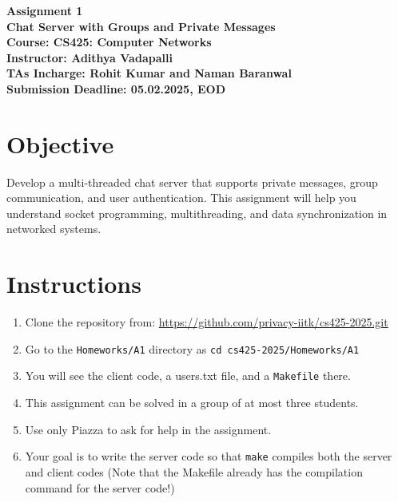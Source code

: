 \documentclass[12pt,a4paper]{article}
\begin{document}
\begin{titlepage}
    \centering
    \vspace{2cm}
    \vspace{1cm}

    {\Huge \textbf{Assignment 1}}\\[1cm]
    {\Large \textbf{Chat Server with Groups and Private Messages}}\\[2cm]

    \textbf{Course: CS425: Computer Networks}\\[0.5cm]
    \textbf{Instructor:  Adithya Vadapalli }\\[0.5cm]
    \textbf{TAs Incharge: Rohit Kumar and Naman Baranwal}\\[3cm]

    \vfill
    \textbf{Submission Deadline: 05.02.2025, EOD}\\[0.5cm]
    \vfill

\end{titlepage}

\section*{Objective}
Develop a multi-threaded chat server that supports private messages, group communication, and user authentication. This assignment will help you understand socket programming, multithreading, and data synchronization in networked systems.

\section*{Instructions}
\begin{enumerate}
\item Clone the repository from: \url{https://github.com/privacy-iitk/cs425-2025.git} 
\item Go to the \texttt{Homeworks/A1} directory as \texttt{cd cs425-2025/Homeworks/A1}
\item You will see the client code, a users.txt file, and a \texttt{Makefile} there. 
\item This assignment can be solved in a group of at most three students.
\item Use only Piazza to ask for help in the assignment. 
\item Your goal is to write the server code so that \texttt{make} compiles both the server and client codes (Note that the Makefile already has the compilation command for the server code!)
\end{enumerate}
\end{document}
